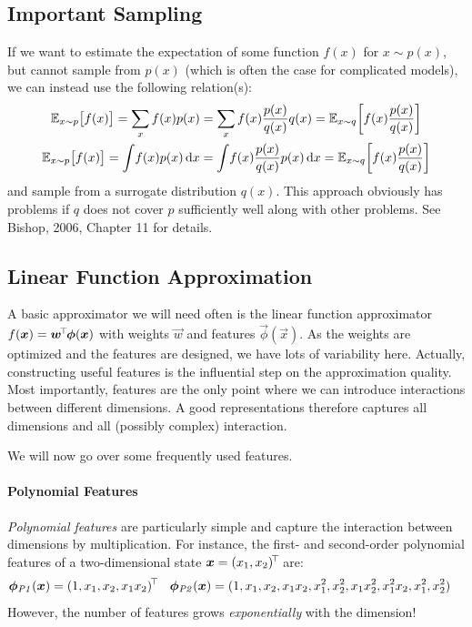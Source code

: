 		\subsection{Important Sampling}
			\label{subsec:importanceSampling}

			If we want to estimate the expectation of some function \(f(x)\) for \( x \sim p(x) \), but cannot sample from \(p(x)\) (which is often the case for complicated models), we can instead use the following relation(s):
			\begin{gather}
				\mathbb{E}_{x \sim p}\bigl[ f(x) \bigr]
					= \sum_x f(x) p(x)
					= \sum_x f(x) \frac{p(x)}{q(x)} q(x)
					= \mathbb{E}_{x \sim q} \biggl[ f(x) \frac{p(x)}{q(x)} \biggr] \\
				\mathbb{E}_{x \sim p}\bigl[ f(x) \bigr]
					= \int\! f(x) p(x) \dd{x}
					= \int\! f(x) \frac{p(x)}{q(x)} p(x) \dd{x}
					= \mathbb{E}_{x \sim q} \biggl[ f(x) \frac{p(x)}{q(x)} \biggr]
			\end{gather}
			and sample from a surrogate distribution \(q(x)\). This approach obviously has problems if \(q\) does not cover \(p\) sufficiently well along with other problems. See Bishop, 2006, Chapter 11 for details.

		\subsection{Linear Function Approximation}
			A basic approximator we will need often is the linear function approximator \( f(\bm{x}) = \bm{w}^{\!\top\!} \bm{\phi}(\bm{x}) \) with weights \(\vec{w}\) and features \(\vec{\phi}(\vec{x})\). As the weights are optimized and the features are designed, we have lots of variability here. Actually, constructing useful features is the influential step on the approximation quality. Most importantly, features are the only point where we can introduce interactions between different dimensions. A good representations therefore captures all dimensions and all (possibly complex) interaction.

			We will now go over some frequently used features.

			\paragraph{Polynomial Features}
				\emph{Polynomial features} are particularly simple and capture the interaction between dimensions by multiplication. For instance, the first- and second-order polynomial features of a two-dimensional state \( \bm{x} = (x_1, x_2)^{\!\top\!} \) are:
				\begin{align}
					\bm{\phi}_\mathit{P1}(\bm{x}) &= (1, x_1, x_2, x_1 x_2)^{\!\top\!} &
					\bm{\phi}_\mathit{P2}(\bm{x}) &= (1, x_1, x_2, x_1 x_2, x_1^2, x_2^2, x_1 x_2^2, x_1^2 x_2, x_1^2, x_2^2)
				\end{align}
				However, the number of features grows \emph{exponentially} with the dimension!

